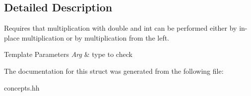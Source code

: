 \subsection{Detailed Description}
Requires that multiplication with double and int can be performed either by in-\/place multiplication or by multiplication from the left. 


\begin{DoxyTemplParams}{Template Parameters}
{\em Arg} & type to check \\
\hline
\end{DoxyTemplParams}


The documentation for this struct was generated from the following file\-:\begin{DoxyCompactItemize}
\item 
concepts.\-hh\end{DoxyCompactItemize}
